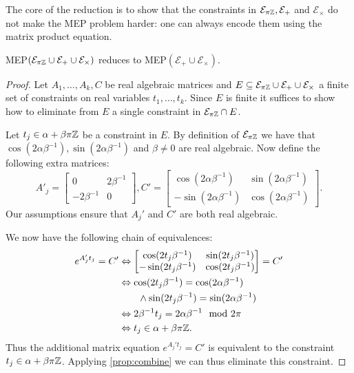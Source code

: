 The core of the reduction is to show that the constraints in
$\mathcal{E}_{\pi\mathbb{Z}},\mathcal{E}_{+}$ and
$\mathcal{E}_{\times}$ do not make the MEP problem harder: one can
always encode them using the matrix product equation.

\begin{proposition}
  MEP$(\mathcal{E}_{\pi\mathbb{Z}} \cup \mathcal{E}_{+} \cup
  \mathcal{E}_{\times})$ reduces to MEP$(\mathcal{E}_{+} \cup
  \mathcal{E}_{\times})$.
\label{lem:pi}
\end{proposition}
\begin{proof}
  Let $A_1,\ldots,A_k,C$ be real algebraic matrices and
  $E\subseteq \mathcal{E}_{\pi\mathbb{Z}} \cup \mathcal{E}_{+} \cup
  \mathcal{E}_{\times}$
  a finite set of constraints on real variables $t_1,\ldots,t_k$.  Since $E$ is
  finite it suffices to show how to eliminate from $E$ a single constraint
  in $\mathcal{E}_{\pi \mathbb{Z}} \cap E$.

  Let $t_{j}\in\alpha+\beta\pi\mathbb{Z}$ be a constraint in $E$.  By definition
of  $\mathcal{E}_{\pi\mathbb{Z}}$
we have
  that $\cos(2\alpha\beta^{-1}),\sin(2\alpha\beta^{-1})$ and
  $\beta\neq0$ are real algebraic.  Now define the following extra
  matrices:
\[A'_j=\begin{bmatrix}0&2\beta^{-1}\\-2\beta^{-1}&0\end{bmatrix},
 C'=\begin{bmatrix}\cos(2\alpha\beta^{-1})&
\sin(2\alpha\beta^{-1})\\-\sin(2\alpha\beta^{-1})&\cos(2\alpha\beta^{-1})\end{bmatrix}.\]
Our assumptions ensure that $A_j'$ and $C'$ are both real algebraic.

We now have the following chain of equivalences:
\begin{align*}
e^{A'_j t_{j}}=C'
&\Leftrightarrow\begin{bmatrix}\cos(2t_{j}\beta^{-1})&
\sin(2t_{j}\beta^{-1})\\-\sin(2t_{j}\beta^{-1})&\cos(2t_{j}\beta^{-1})\end{bmatrix}
=C'\\
&\Leftrightarrow\cos(2t_{j}\beta^{-1})=\cos(2\alpha\beta^{-1}) \\
&\qquad\wedge\sin(2t_{j}\beta^{-1})=\sin(2\alpha\beta^{-1}) \\
&\Leftrightarrow2\beta^{-1}t_{j}=2\alpha\beta^{-1}\mod 2\pi \\
&\Leftrightarrow t_{j}\in\alpha+\beta\pi\mathbb{Z}.
\end{align*}
Thus the additional matrix equation $e^{A_j't_{j}}=C'$ is equivalent to
the constraint $t_{j}\in\alpha+\beta\pi\mathbb{Z}$.  Applying
\cref{prop:combine} we can thus eliminate this constraint.
\end{proof}

